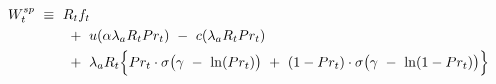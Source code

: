 \begin{equation}
\begin{split}
     W_{t}^{sp} \ 
     & \equiv \ R_{t} f_{t} \\
     & \hspace{0.7cm} + \ u(\alpha \lambda_{a} R_{t} Pr_{t}) \ - \ c(\lambda_{a} R_{t} Pr_{t}) \\
     & \hspace{0.7cm} + \ \lambda_{a} R_{t} \Big\{ Pr_{t} \cdot \sigma \big( \gamma \ - \ \ln(Pr_{t}) \big) \ + \ (1 - Pr_{t}) \cdot \sigma \big( \gamma \ - \ \ln(1 - Pr_{t}) \big) \Big\}
\label{Equation:Social-Planners-Problem_Welfare}
\end{split}
\end{equation}